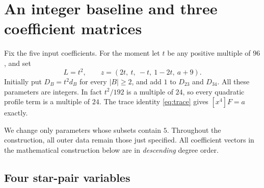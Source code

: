 \documentclass[11pt,a4paper]{article}
\theoremstyle{definition}
\begin{document}
\section{An integer baseline and three coefficient matrices}\label{sec:matrices}

Fix the five input coefficients. For the moment let $t$ be any positive
multiple of $96$, and set
\begin{equation}\label{eq:baseline}
 L=t^2,\qquad
 z=(2t,\ t,\ -t,\ 1-2t,\ a+9).
\end{equation}
Initially put $D_B=t^2d_B$ for every $|B|\ge2$, and add $1$ to
$D_{23}$ and $D_{34}$. All these parameters are integers. In fact
$t^2/192$ is a multiple of $24$, so every quadratic profile term is a
multiple of $24$.
The trace identity \eqref{eq:trace} gives $[x^4]F=a$ exactly.

We change only parameters whose subsets contain $5$. Throughout the
construction, all outer data remain those just specified.
All coefficient vectors in the mathematical construction below are in
\emph{descending} degree order.

\subsection{Four star-pair variables}
\end{document}
